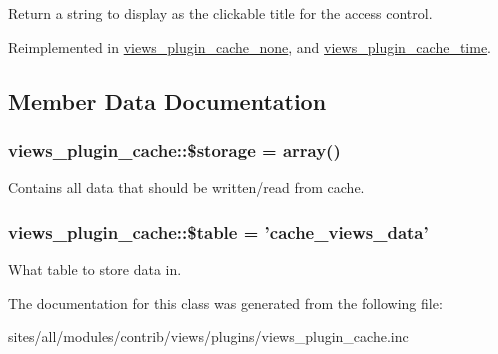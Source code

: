 Return a string to display as the clickable title for the access control. 

Reimplemented in \hyperlink{classviews__plugin__cache__none_52838d0e7db62b5e92f837df6a4931b9}{views\_\-plugin\_\-cache\_\-none}, and \hyperlink{classviews__plugin__cache__time_c8eaac0cd0c620c7583dbbe0481ca62c}{views\_\-plugin\_\-cache\_\-time}.

\subsection{Member Data Documentation}
\hypertarget{classviews__plugin__cache_dedb6ce98b20d56856176eb732887c89}{
\subsubsection[{\$storage}]{\setlength{\rightskip}{0pt plus 5cm}views\_\-plugin\_\-cache::\$storage = array()}}
\label{classviews__plugin__cache_dedb6ce98b20d56856176eb732887c89}


Contains all data that should be written/read from cache. \hypertarget{classviews__plugin__cache_b87d5a0d212d539d19825a26e88fc070}{
\subsubsection[{\$table}]{\setlength{\rightskip}{0pt plus 5cm}views\_\-plugin\_\-cache::\$table = 'cache\_\-views\_\-data'}}
\label{classviews__plugin__cache_b87d5a0d212d539d19825a26e88fc070}


What table to store data in. 

The documentation for this class was generated from the following file:\begin{CompactItemize}
\item 
sites/all/modules/contrib/views/plugins/views\_\-plugin\_\-cache.inc\end{CompactItemize}
